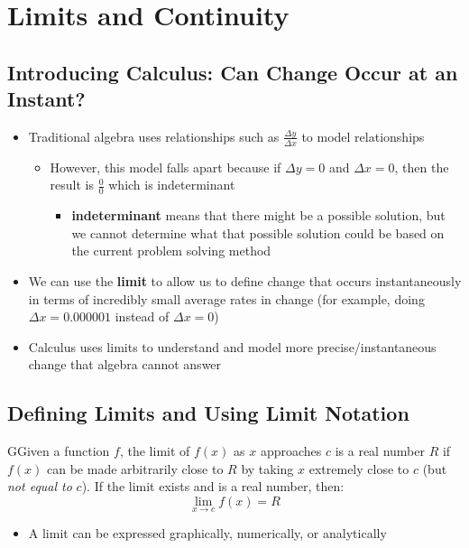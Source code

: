 \documentclass{package/notes}
\begin{document}
\chapter{Limits and Continuity}

\section{Introducing Calculus: Can Change Occur at an Instant?}
\begin{itemize}
	\item Traditional algebra uses relationships such as $\frac{\Delta y}{\Delta x}$ to model relationships
	\begin{itemize}
		\item However, this model falls apart because if $\Delta y = 0$ and $\Delta x = 0$, then the result is $\frac{0}{0}$ which is indeterminant
		\begin{itemize}
			\item \textbf{indeterminant} means that there might be a possible solution, but we cannot determine what that possible solution could be based on the current problem solving method
		\end{itemize}
	\end{itemize}

	\item We can use the \textbf{limit} to allow us to define change that occurs instantaneously in terms of incredibly small average rates in change (for example, doing $\Delta x = 0.000001$ instead of $\Delta x = 0$)
	\item Calculus uses limits to understand and model more precise/instantaneous change that algebra cannot answer
\end{itemize}

\section{Defining Limits and Using Limit Notation}
\begin{definition}
	GGiven a function $f$, the limit of $f(x)$ as $x$ approaches $c$ is a real number $R$ if $f(x)$ can be made arbitrarily close to $R$ by taking $x$ extremely close to $c$ (but \textit{not equal to} $c$).
	\newline\newline
	If the limit exists and is a real number, then:
	$$ \lim_{x\to c}f(x) = R$$
\end{definition}

\begin{itemize}
	\item A limit can be expressed graphically, numerically, or analytically
\end{itemize}
\newpage
\end{document}
